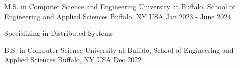 

\begin{cventries}


  \cventry
    {M.S. in Computer Science and Engineering} %
    {University at Buffalo, School of Engineering and Applied Sciences} %
    {Buffalo, NY USA} %
    {Jan 2023 - June 2024} %
    {
      \begin{cvitems} %
        \item {Specializing in Distributed Systems}
      \end{cvitems}
    }


  \cventry
    {B.S. in Computer Science} %
    {University at Buffalo, School of Engineering and Applied Sciences} %
    {Buffalo, NY USA} %
    {Dec 2022} %
    {
      \begin{cvitems} %
      \end{cvitems}
    }

\end{cventries}
